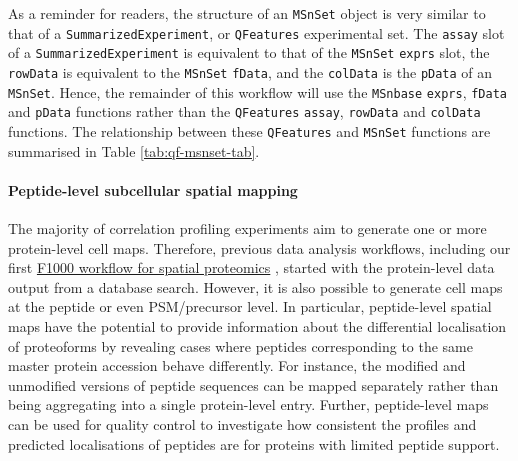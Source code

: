 \documentclass[9pt,a4paper,]{extarticle}
\begin{document}
As a reminder for readers, the structure of an \texttt{MSnSet} object is very similar to
that of a \texttt{SummarizedExperiment}, or \texttt{QFeatures} experimental set. The \texttt{assay}
slot of a \texttt{SummarizedExperiment} is equivalent to that of the \texttt{MSnSet} \texttt{exprs} slot,
the \texttt{rowData} is equivalent to the \texttt{MSnSet} \texttt{fData}, and the \texttt{colData} is the \texttt{pData}
of an \texttt{MSnSet}. Hence, the remainder of this workflow will use the \texttt{MSnbase}
\texttt{exprs}, \texttt{fData} and \texttt{pData} functions rather than the \texttt{QFeatures} \texttt{assay},
\texttt{rowData} and \texttt{colData} functions. The relationship between these \texttt{QFeatures} and
\texttt{MSnSet} functions are summarised in Table \ref{tab:qf-msnset-tab}.

\paragraph{Peptide-level subcellular spatial mapping}\label{peptide-level-subcellular-spatial-mapping}

The majority of correlation profiling experiments aim to generate one or more
protein-level cell maps. Therefore, previous data analysis workflows,
including our first \href{https://f1000research.com/articles/5-2926}{F1000 workflow for spatial proteomics}
\citep{Breckels2018}, started with the protein-level data output from a database
search. However, it is also possible to generate cell maps at the peptide or
even PSM/precursor level. In particular, peptide-level spatial maps have the
potential to provide information about the differential localisation of proteoforms
by revealing cases where peptides corresponding to the same master protein
accession behave differently. For instance, the modified and unmodified versions
of peptide sequences can be mapped separately rather than being aggregating
into a single protein-level entry. Further, peptide-level maps can be used
for quality control to investigate how consistent the profiles and predicted
localisations of peptides are for proteins with limited peptide support.
\end{document}
